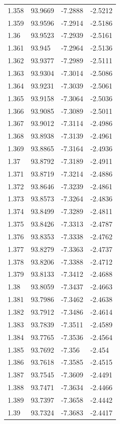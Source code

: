 \begin{tabular}{llll}
1.358 & 93.9669 & -7.2888 & -2.5212 \\
1.359 & 93.9596 & -7.2914 & -2.5186 \\
1.36 & 93.9523 & -7.2939 & -2.5161 \\
1.361 & 93.945 & -7.2964 & -2.5136 \\
1.362 & 93.9377 & -7.2989 & -2.5111 \\
1.363 & 93.9304 & -7.3014 & -2.5086 \\
1.364 & 93.9231 & -7.3039 & -2.5061 \\
1.365 & 93.9158 & -7.3064 & -2.5036 \\
1.366 & 93.9085 & -7.3089 & -2.5011 \\
1.367 & 93.9012 & -7.3114 & -2.4986 \\
1.368 & 93.8938 & -7.3139 & -2.4961 \\
1.369 & 93.8865 & -7.3164 & -2.4936 \\
1.37 & 93.8792 & -7.3189 & -2.4911 \\
1.371 & 93.8719 & -7.3214 & -2.4886 \\
1.372 & 93.8646 & -7.3239 & -2.4861 \\
1.373 & 93.8573 & -7.3264 & -2.4836 \\
1.374 & 93.8499 & -7.3289 & -2.4811 \\
1.375 & 93.8426 & -7.3313 & -2.4787 \\
1.376 & 93.8353 & -7.3338 & -2.4762 \\
1.377 & 93.8279 & -7.3363 & -2.4737 \\
1.378 & 93.8206 & -7.3388 & -2.4712 \\
1.379 & 93.8133 & -7.3412 & -2.4688 \\
1.38 & 93.8059 & -7.3437 & -2.4663 \\
1.381 & 93.7986 & -7.3462 & -2.4638 \\
1.382 & 93.7912 & -7.3486 & -2.4614 \\
1.383 & 93.7839 & -7.3511 & -2.4589 \\
1.384 & 93.7765 & -7.3536 & -2.4564 \\
1.385 & 93.7692 & -7.356 & -2.454 \\
1.386 & 93.7618 & -7.3585 & -2.4515 \\
1.387 & 93.7545 & -7.3609 & -2.4491 \\
1.388 & 93.7471 & -7.3634 & -2.4466 \\
1.389 & 93.7397 & -7.3658 & -2.4442 \\
1.39 & 93.7324 & -7.3683 & -2.4417 \\

\end{tabular}
